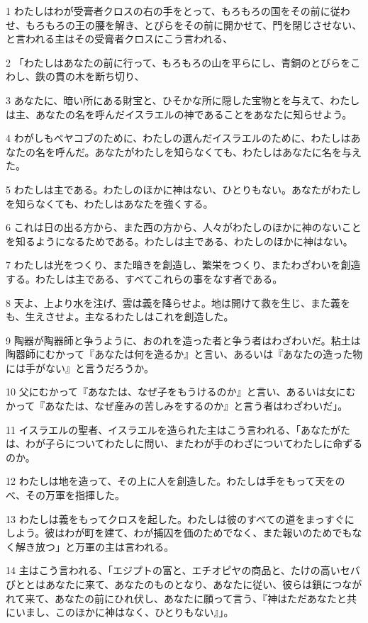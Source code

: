 \par 1 わたしはわが受膏者クロスの右の手をとって、もろもろの国をその前に従わせ、もろもろの王の腰を解き、とびらをその前に開かせて、門を閉じさせない、と言われる主はその受膏者クロスにこう言われる、
\par 2 「わたしはあなたの前に行って、もろもろの山を平らにし、青銅のとびらをこわし、鉄の貫の木を断ち切り、
\par 3 あなたに、暗い所にある財宝と、ひそかな所に隠した宝物とを与えて、わたしは主、あなたの名を呼んだイスラエルの神であることをあなたに知らせよう。
\par 4 わがしもべヤコブのために、わたしの選んだイスラエルのために、わたしはあなたの名を呼んだ。あなたがわたしを知らなくても、わたしはあなたに名を与えた。
\par 5 わたしは主である。わたしのほかに神はない、ひとりもない。あなたがわたしを知らなくても、わたしはあなたを強くする。
\par 6 これは日の出る方から、また西の方から、人々がわたしのほかに神のないことを知るようになるためである。わたしは主である、わたしのほかに神はない。
\par 7 わたしは光をつくり、また暗きを創造し、繁栄をつくり、またわざわいを創造する。わたしは主である、すべてこれらの事をなす者である。
\par 8 天よ、上より水を注げ、雲は義を降らせよ。地は開けて救を生じ、また義をも、生えさせよ。主なるわたしはこれを創造した。
\par 9 陶器が陶器師と争うように、おのれを造った者と争う者はわざわいだ。粘土は陶器師にむかって『あなたは何を造るか』と言い、あるいは『あなたの造った物には手がない』と言うだろうか。
\par 10 父にむかって『あなたは、なぜ子をもうけるのか』と言い、あるいは女にむかって『あなたは、なぜ産みの苦しみをするのか』と言う者はわざわいだ」。
\par 11 イスラエルの聖者、イスラエルを造られた主はこう言われる、「あなたがたは、わが子らについてわたしに問い、またわが手のわざについてわたしに命ずるのか。
\par 12 わたしは地を造って、その上に人を創造した。わたしは手をもって天をのべ、その万軍を指揮した。
\par 13 わたしは義をもってクロスを起した。わたしは彼のすべての道をまっすぐにしよう。彼はわが町を建て、わが捕囚を価のためでなく、また報いのためでもなく解き放つ」と万軍の主は言われる。
\par 14 主はこう言われる、「エジプトの富と、エチオピヤの商品と、たけの高いセバびととはあなたに来て、あなたのものとなり、あなたに従い、彼らは鎖につながれて来て、あなたの前にひれ伏し、あなたに願って言う、『神はただあなたと共にいまし、このほかに神はなく、ひとりもない』」。
